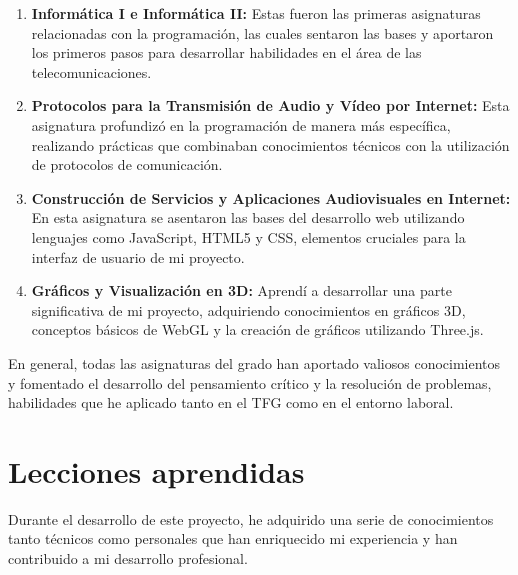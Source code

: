 \documentclass[a4paper, 12pt]{book}
\begin{document}
\begin{enumerate}
  \item \textbf{Informática I e Informática II:} Estas fueron las primeras asignaturas relacionadas con la programación, 
  las cuales sentaron las bases y aportaron los primeros pasos para desarrollar habilidades en el área de las telecomunicaciones.
  \item \textbf{Protocolos para la Transmisión de Audio y Vídeo por Internet:} Esta asignatura profundizó en la programación de manera 
  más específica, realizando prácticas que combinaban conocimientos técnicos con la utilización de protocolos de comunicación.
  \item \textbf{Construcción de Servicios y Aplicaciones Audiovisuales en Internet:} En esta asignatura se asentaron las bases del desarrollo 
  web utilizando lenguajes como JavaScript, HTML5 y CSS, elementos cruciales para la interfaz de usuario de mi proyecto.
  \item \textbf{Gráficos y Visualización en 3D:} Aprendí a desarrollar una parte significativa de mi proyecto, adquiriendo conocimientos en 
  gráficos 3D, conceptos básicos de WebGL y la creación de gráficos utilizando Three.js.
\end{enumerate}

En general, todas las asignaturas del grado han aportado valiosos conocimientos y fomentado el desarrollo del pensamiento crítico y la resolución de problemas, habilidades que he aplicado tanto en el TFG como en el entorno laboral.

\section{Lecciones aprendidas}
\label{sec:lecciones_aprendidas}

Durante el desarrollo de este proyecto, he adquirido una serie de conocimientos tanto técnicos como personales que han enriquecido 
mi experiencia y han contribuido a mi desarrollo profesional.
\end{document}
